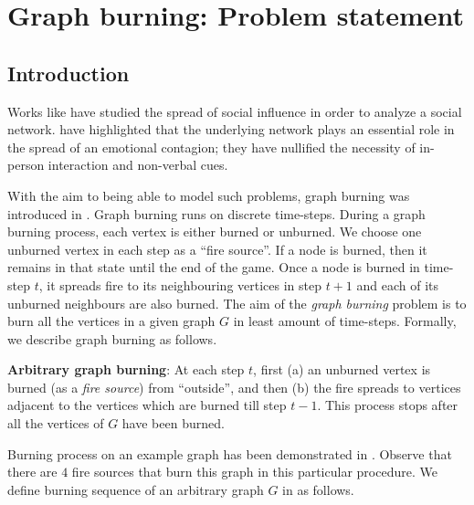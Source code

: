 \chapter{Graph burning: Problem statement}\label{chapter:graph-burning}

\section{Introduction}\label{section:burning-intro}

Works like \cite{Banerjee2012,Domingos2001,Kempe2003,Kempe2005,Mossel2007,Richardson2002} have studied the spread of social influence in order to analyze a social network. \cite{Kramer2014} have highlighted that the underlying network plays an essential role in the spread of an emotional contagion; they have nullified the necessity of in-person interaction and non-verbal cues.

With the aim to being able to model such problems, graph burning was introduced in \cite{Bonato2016}. Graph burning runs on discrete time-steps. During a graph burning process, each vertex is either burned or unburned. We choose one unburned vertex in each step as a ``fire source''. If a node is burned, then it remains in that state until the end of the game. Once a node is burned in time-step $t$, it spreads fire to its neighbouring vertices in step $t+1$ and each of its unburned neighbours are also burned. The aim of the \textit{graph burning} problem is to burn all the vertices in a given graph $G$ in least amount of time-steps. Formally, we describe graph burning as follows.

\noindent\textbf{Arbitrary graph burning}: At each step $t$, first (a) an unburned vertex is burned (as a \textit{fire source}) from ``outside'', and then (b) the fire spreads to vertices adjacent to the vertices which are burned till step $t-1$. This process stops after all the vertices of $G$ have been burned.

Burning process on an example graph has been demonstrated in . Observe that there are $4$ fire sources that burn this graph in this particular procedure. We define burning sequence of an arbitrary graph $G$ in  as follows.

